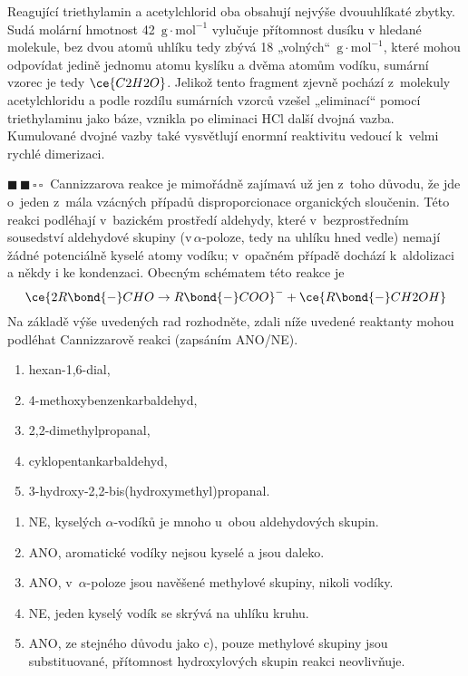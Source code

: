 \documentclass{book}
\newcommand{\dva}{$\blacksquare \, \blacksquare \, \square \, \square \; \; $}
\renewenvironment{quotation}{\par}{\par} %
\begin{document}
Reagující triethylamin a acetylchlorid oba obsahují nejvýše dvouuhlíkaté
zbytky. Sudá molární hmotnost 42~$\mathrm{g\cdot mol^{-1}}$ vylučuje přítomnost dusíku
v hledané molekule, bez dvou atomů uhlíku tedy zbývá 18 „volných“~$\mathrm{g\cdot mol^{-1}}$, které mohou odpovídat jedině jednomu atomu kyslíku a dvěma
atomům vodíku, sumární vzorec je tedy $\ce{C2H2O}$. Jelikož tento
fragment zjevně pochází z~molekuly acetylchloridu a podle rozdílu
sumárních vzorců vzešel „eliminací“ pomocí triethylaminu jako báze,
vznikla po eliminaci HCl další dvojná vazba. Kumulované dvojné vazby
také vysvětlují enormní reaktivitu vedoucí k~velmi rychlé dimerizaci.

\hrulefill %
\begin{quotation}
\dva Cannizzarova reakce je mimořádně zajímavá už jen z~toho důvodu, že
jde o~jeden z~mála vzácných případů disproporcionace organických sloučenin.
Této reakci podléhají v~bazickém prostředí aldehydy, které v~bezprostředním
sousedství aldehydové skupiny (v\,$\alpha$-poloze, tedy na uhlíku
hned vedle) nemají žádné potenciálně kyselé atomy vodíku; v~opačném
případě dochází k~aldolizaci a někdy i ke kondenzaci. Obecným schématem
této reakce je 
\[
\ce{2R\bond{-}CHO\rightarrow R\bond{-}COO}^{-}+\ce{R\bond{-}CH2OH}
\]
 Na základě výše uvedených rad rozhodněte, zdali níže uvedené reaktanty
mohou podléhat Cannizzarově reakci (zapsáním ANO/NE).
\begin{enumerate}[label=\alph*)]
\item hexan-1,6-dial,
\item 4-methoxybenzenkarbaldehyd,
\item 2,2-dimethylpropanal,
\item cyklopentankarbaldehyd,
\item 3-hydroxy-2,2-bis(hydroxymethyl)propanal. 
\end{enumerate}
\end{quotation} \dotfill \par 
\begin{enumerate}[label=\alph*)]
\item NE, kyselých $\alpha$-vodíků je mnoho u~obou aldehydových
skupin.
\item ANO, aromatické vodíky nejsou kyselé a jsou daleko.
\item ANO, v~$\alpha$-poloze jsou navěšené methylové skupiny, nikoli
vodíky.
\item NE, jeden kyselý vodík se skrývá na uhlíku kruhu.
\item ANO, ze stejného důvodu jako c), pouze methylové skupiny jsou
substituované, přítomnost hydroxylových skupin reakci neovlivňuje.
\end{enumerate}
\end{document}
